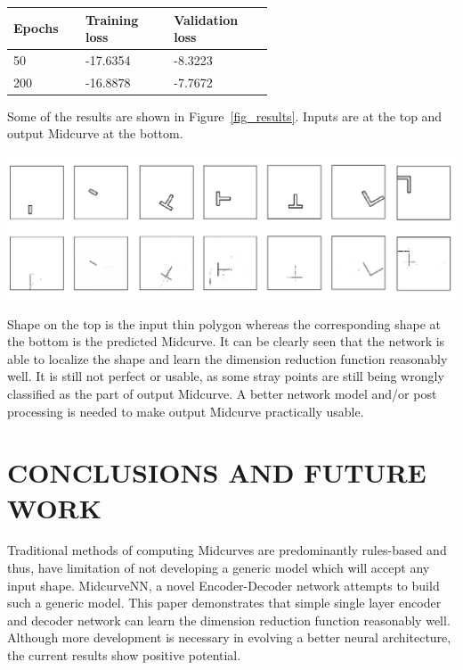 \documentclass[9pt,academicons]{article}
\begin{document}
\begin{table}[h]
\centering

\begin{tabular}[htbp]{@{} p{0.14\linewidth}  p{0.22\linewidth}  p{0.22\linewidth}  @{}} \toprule
{\bf Epochs } & {\bf Training loss }  & {\bf Validation loss} \\
\midrule
50	& -17.6354	& -8.3223\\
200	& -16.8878	& -7.7672 \\
\bottomrule
\end{tabular}
\label{tbl_loss}
\end{table}


Some of the results are shown in Figure~\ref{fig_results}. Inputs are at the top and output Midcurve at the bottom.

     \begin{center}
	\includegraphics[width=\linewidth]{images/Midcurvenn_results}
	\label{fig_results}
    \end{center}

Shape on the top is the input thin polygon whereas the corresponding shape at the bottom is the predicted Midcurve. It can be clearly seen that the network is able to localize the shape and learn the dimension reduction function reasonably well. It is still not perfect or usable, as some stray points are still being wrongly classified as the part of output Midcurve. A better network model and/or post processing is needed to make output Midcurve practically usable.


\section{CONCLUSIONS AND FUTURE WORK}

Traditional methods of computing Midcurves are predominantly rules-based and thus, have limitation of not developing a generic model which will accept any input shape. MidcurveNN, a novel Encoder-Decoder network attempts to build such a generic model. This paper demonstrates that simple single layer encoder and decoder network can learn the dimension reduction function reasonably well. Although more development is necessary in evolving a better neural architecture, the current results show positive potential. 
\end{document}
